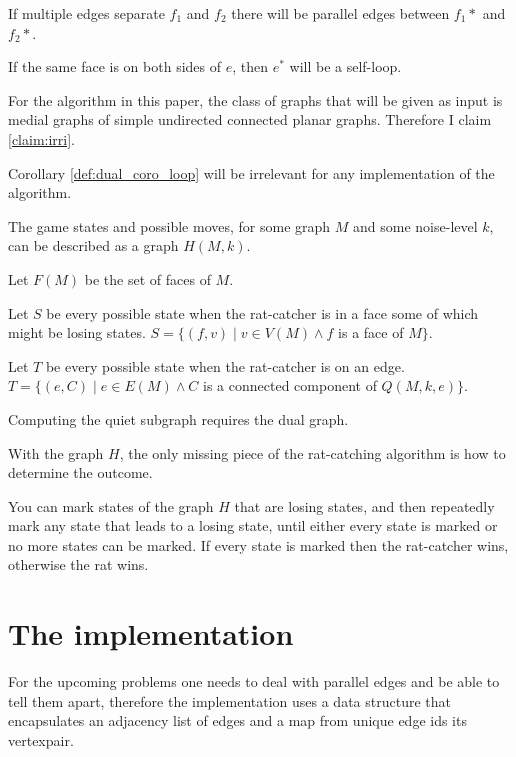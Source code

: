 \documentclass{article}
\begin{document}
	\begin{corollary}
		If multiple edges separate $f_1$ and $f_2$ there will be parallel edges between $f_1*$ and $f_2*$.
	\end{corollary}
	
	\begin{corollary}\label{def:dual_coro_loop}
		If the same face is on both sides of $e$, then $e^*$ will be a self-loop.
	\end{corollary}

	For the algorithm in this paper, the class of graphs that will be given as input is medial graphs of simple undirected connected planar graphs. Therefore I claim \ref{claim:irri}.

	\begin{claim}\label{claim:irri}
		Corollary \ref{def:dual_coro_loop} will be irrelevant for any implementation of the algorithm.
	\end{claim}

	The game states and possible moves, for some graph $M$ and some noise-level $k$, can be described as a graph $H(M, k)$.

	Let $F(M)$ be the set of faces of $M$.

	Let $S$ be every possible state when the rat-catcher is in a face some of which might be losing states. $S = \{ (f, v) \mid v \in V(M) \land f$ is a face of $ M \}$.

	Let $T$ be every possible state when the rat-catcher is on an edge. $T = \{ (e, C) \mid e \in E(M) \land C$ is a connected component of $Q(M, k, e) \}$.

	Computing the quiet subgraph requires the dual graph. 
	
	With the graph $H$, the only missing piece of the rat-catching algorithm is how to determine the outcome.

	You can mark states of the graph $H$ that are losing states, and then repeatedly mark any state that leads to a losing state, until either every state is marked or no more states can be marked. If every state is marked then the rat-catcher wins, otherwise the rat wins.

\section{The implementation}

	For the upcoming problems one needs to deal with parallel edges and be able to tell them apart, therefore the implementation uses a data structure that encapsulates an adjacency list of edges and a map from unique edge ids its vertexpair.
\end{document}
